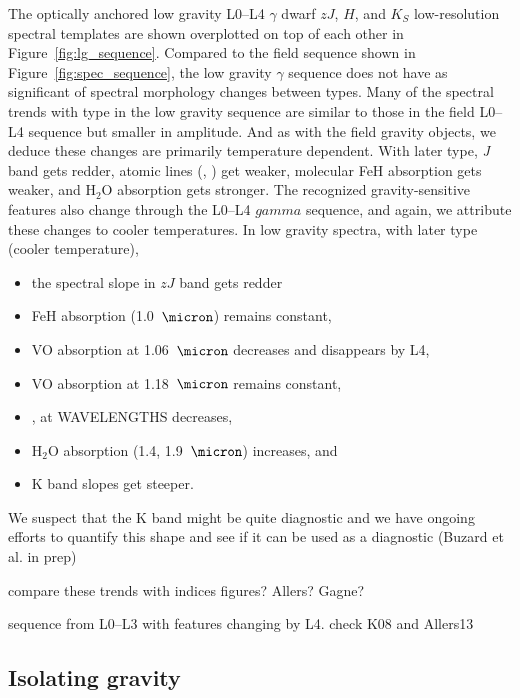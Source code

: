 \documentclass[12pt,preprint]{aastex}
\begin{document}
The optically anchored low gravity L0--L4 $\gamma$ dwarf $zJ$, $H$, and $K_S$ low-resolution spectral templates are shown overplotted on top of each other in Figure~\ref{fig:lg_sequence}. 
Compared to the field sequence shown in Figure~\ref{fig:spec_sequence}, the low gravity $\gamma$ sequence does not have as significant of spectral morphology changes between types.
Many of the spectral trends with type in the low gravity sequence are similar to those in the field L0--L4 sequence but smaller in amplitude. And as with the field gravity objects, we deduce these changes are primarily temperature dependent. With later type, \emph{J} band gets redder, atomic lines (, ) get weaker, molecular FeH absorption gets weaker, and H$_2$O absorption gets stronger. The recognized gravity-sensitive features also change through the L0--L4 $gamma$ sequence, and again, we attribute these changes to cooler temperatures.
In low gravity spectra, with later type (cooler temperature),
\begin{itemize}
\item the spectral slope in $zJ$ band gets redder 
\item FeH absorption (1.0~$\micron$) remains constant,
\item VO absorption at 1.06~$\micron$ decreases and disappears by L4,
\item VO absorption at 1.18~$\micron$ remains constant,
\item {},  at WAVELENGTHS decreases, 
\item H$_2$O absorption (1.4, 1.9~$\micron$) increases, and
\item K band slopes get steeper. 
\end{itemize}

We suspect that the K band might be quite diagnostic and we have ongoing efforts to quantify this shape and see if it can be used as a diagnostic (Buzard et al. in prep)

compare these trends with indices figures? Allers? Gagne?

sequence from L0--L3 with features changing by L4. check K08 and Allers13

\subsection{Isolating gravity} 
\end{document}
